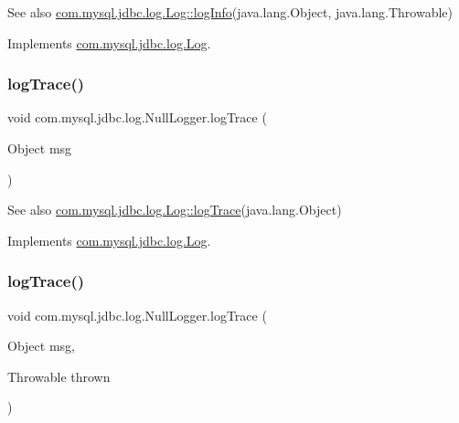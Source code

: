 \begin{DoxySeeAlso}{See also}
\mbox{\hyperlink{interfacecom_1_1mysql_1_1jdbc_1_1log_1_1_log_a6a380b7638c3ebe1251d4e07cb7f4569}{com.\+mysql.\+jdbc.\+log.\+Log\+::log\+Info}}(java.\+lang.\+Object, java.\+lang.\+Throwable) 
\end{DoxySeeAlso}


Implements \mbox{\hyperlink{interfacecom_1_1mysql_1_1jdbc_1_1log_1_1_log_a577190d2919e07471dcd29d57eebee30}{com.\+mysql.\+jdbc.\+log.\+Log}}.

\mbox{\label{classcom_1_1mysql_1_1jdbc_1_1log_1_1_null_logger_ad02d3a7495ef1e52a7d558fdabb5d76b}} 
\subsubsection{\texorpdfstring{log\+Trace()}{logTrace()}\hspace{0.1cm}{\footnotesize\ttfamily [1/2]}}
{\footnotesize\ttfamily void com.\+mysql.\+jdbc.\+log.\+Null\+Logger.\+log\+Trace (\begin{DoxyParamCaption}\item[{Object}]{msg }\end{DoxyParamCaption})}

\begin{DoxySeeAlso}{See also}
\mbox{\hyperlink{interfacecom_1_1mysql_1_1jdbc_1_1log_1_1_log_a8946382e4cf99819a43cdb3783fd0ee3}{com.\+mysql.\+jdbc.\+log.\+Log\+::log\+Trace}}(java.\+lang.\+Object) 
\end{DoxySeeAlso}


Implements \mbox{\hyperlink{interfacecom_1_1mysql_1_1jdbc_1_1log_1_1_log_a8946382e4cf99819a43cdb3783fd0ee3}{com.\+mysql.\+jdbc.\+log.\+Log}}.

\mbox{\label{classcom_1_1mysql_1_1jdbc_1_1log_1_1_null_logger_a5c6f91128dff5836650a7dbfea43ddf2}} 
\subsubsection{\texorpdfstring{log\+Trace()}{logTrace()}\hspace{0.1cm}{\footnotesize\ttfamily [2/2]}}
{\footnotesize\ttfamily void com.\+mysql.\+jdbc.\+log.\+Null\+Logger.\+log\+Trace (\begin{DoxyParamCaption}\item[{Object}]{msg,  }\item[{Throwable}]{thrown }\end{DoxyParamCaption})}

